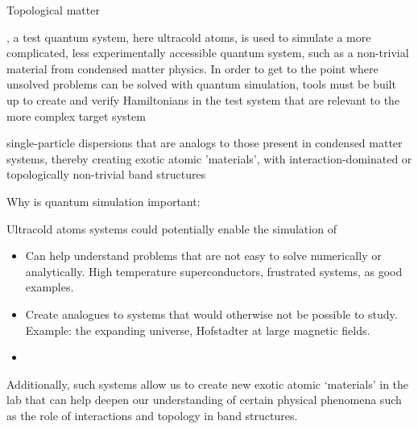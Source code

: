 Topological matter

, a test quantum system, here ultracold atoms, is used to simulate a more
complicated, less experimentally accessible quantum system, such as a non-trivial
material from condensed matter physics. In order to get to the point where unsolved
problems can be solved with quantum simulation, tools must be built up to create
and verify Hamiltonians in the test system that are relevant to the more complex
target system

single-particle dispersions that are analogs to those present in condensed matter systems, thereby creating exotic atomic 'materials', with interaction-dominated or topologically non-trivial band structures

Why is quantum simulation important:

Ultracold atoms systems could potentially enable the simulation of 

\begin{itemize}
	\item Can help understand problems that are not easy to solve numerically or analytically. High temperature superconductors, frustrated systems, as good examples.
	\item Create analogues to systems that would otherwise not be possible to study. Example: the expanding universe, Hofstadter at large magnetic fields.
	\item 
\end{itemize}


Additionally, such systems allow us to create new exotic atomic `materials' in the lab that can help deepen our understanding of certain physical phenomena such as the role of interactions and topology in band structures. 







